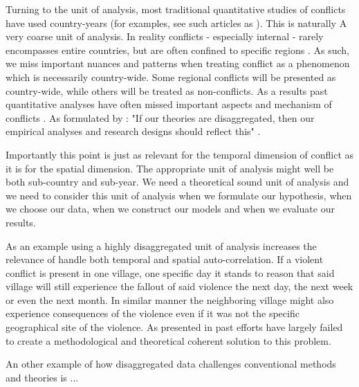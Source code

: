 \documentclass[a4paper]{article}
\begin{document}
Turning to the unit of analysis, most traditional quantitative studies of conflicts have used country-years (for examples, see such articles as \cite{Collier_Hoeffler_1998, Fearon_Laitin_2003, Collier_Hoeffler_2004, Fearon_2004, Ross_2004, Fearon_2005, Hegre_Sambanis_2006, Goldstone_2010}). This is naturally A very coarse unit of analysis. In reality conflicts - especially internal - rarely encompasses entire countries, but are often confined to specific regions \cite[487]{Cederman_Gleditsch_2009}. As such, we miss important nuances and patterns when treating conflict as a phenomenon which is necessarily country-wide. Some regional conflicts will be presented as country-wide, while others will be treated as non-conflicts. As a results past quantitative analyses have often missed important aspects and mechanism of conflicts \cite{Cederman_Gleditsch_2009, Cederman_Gleditsch_Buhaug_2013}. As formulated by \cite{Cederman_Gleditsch_2009}: "If our theories are disaggregated, then our empirical analyses and research designs should reflect this" \citep[490]{Cederman_Gleditsch_2009}.\par 

Importantly this point is just as relevant for the temporal dimension of conflict as it is for the spatial dimension. The appropriate unit of analysis might well be both sub-country and sub-year. We need a theoretical sound unit of analysis and we need to consider this unit of analysis when we formulate our hypothesis, when we choose our data, when we construct our models and when we evaluate our results.\par 

As an example using a highly disaggregated unit of analysis increases the relevance of handle both temporal and spatial auto-correlation. If a violent conflict is present in one village, one specific day it stands to reason that said village will still experience the fallout of said violence the next day, the next week or even the next month. In similar manner the neighboring village might also experience consequences of the violence even if it was not the specific geographical site of the violence. As presented in \cite{SPECIALE} past efforts have largely failed to create a methodological and theoretical coherent solution to this problem.\par 

An other example of how disaggregated data challenges conventional methods and theories is ... \par
\end{document}
